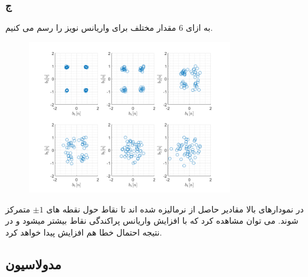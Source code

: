 \documentclass[a4paper]{article}
\begin{document}
	\subsubsection*{ج}
	به ازای 6 مقدار مختلف برای واریانس نویز  را رسم می کنیم.
	\newline
	\begin{figure}[h!]
		\includegraphics[width=0.8\textwidth]{comsys_fig18.png}\\ 
		\centering
	\end{figure}
	\newline
	در نمودارهای بالا مقادیر حاصل از  نرمالیزه شده اند تا نقاط حول نقطه های 
	$\pm 1$
	متمرکز شوند. می توان مشاهده کرد که با افزایش واریانس پراکندگی نقاط بیشتر میشود و در نتیجه احتمال خطا هم افزایش پیدا خواهد کرد.
	\subsection{مدولاسیون }
\end{document}
